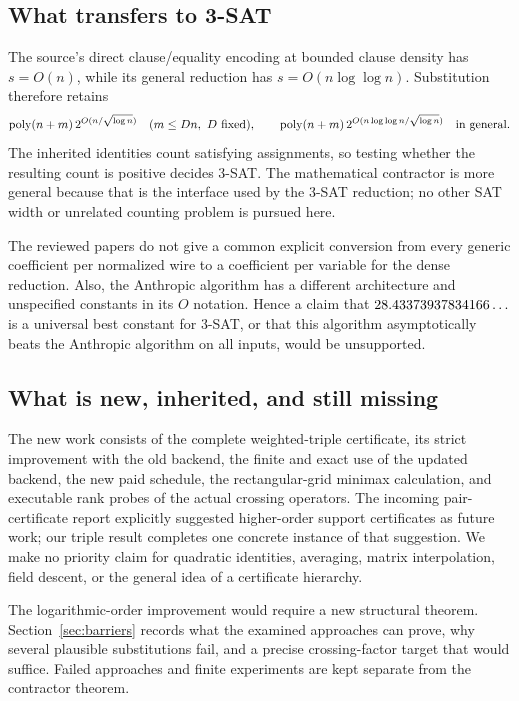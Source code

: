 \subsection{What transfers to 3-SAT}

The source's direct clause/equality encoding at bounded clause density
has $s=O(n)$, while its general reduction has $s=O(n\log\log n)$.
Substitution therefore retains
\begin{equation}\label{eq:satorders}
 \operatorname{poly}(n+m)\,2^{O(n/\sqrt{\log n})}
 \quad(m\le Dn,\ D\text{ fixed}),\qquad
 \operatorname{poly}(n+m)\,2^{O(n\log\log n/\sqrt{\log n})}
 \quad\text{in general}.
\end{equation}
The inherited identities count satisfying assignments, so testing whether
the resulting count is positive decides 3-SAT. The mathematical contractor
is more general because that is the interface used by the 3-SAT reduction;
no other SAT width or unrelated counting problem is pursued here.

The reviewed papers do not give a common explicit conversion from every
generic coefficient per normalized wire to a coefficient per variable for
the dense reduction. Also, the Anthropic algorithm has a different
architecture and unspecified constants in its $O$ notation. Hence a claim
that $28.43373937834166\ldots$ is a universal best constant for 3-SAT, or that this algorithm
asymptotically beats the Anthropic algorithm on all inputs, would be
unsupported.

\subsection{What is new, inherited, and still missing}

The new work consists of the complete weighted-triple certificate, its
strict improvement with the old backend, the finite and exact use of the
updated backend, the new paid schedule, the rectangular-grid minimax
calculation, and executable rank probes of the actual crossing operators.
The incoming pair-certificate report explicitly suggested higher-order
support certificates as future work; our triple result completes one
concrete instance of that suggestion. We make no priority claim for
quadratic identities, averaging, matrix interpolation, field descent, or
the general idea of a certificate hierarchy.

The logarithmic-order improvement would require a new structural theorem.
Section~\ref{sec:barriers} records what the examined approaches can prove,
why several plausible substitutions fail, and a precise crossing-factor
target that would suffice. Failed approaches and finite experiments are
kept separate from the contractor theorem.
